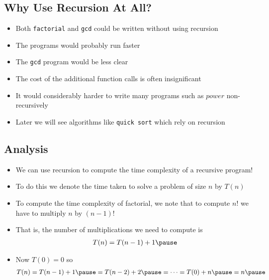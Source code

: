 \begin{slide}
\section[-1]{Why Use Recursion At All?}

\begin{PauseHighLight}
  \begin{itemize}
  \item Both \texttt{factorial} and \texttt{gcd} could be written
    without using recursion\pause
  \item The programs would probably run faster\pause
  \item The \texttt{gcd} program would be less clear\pause
  \item The cost of the additional function calls is often
    insignificant\pause
  \item It would considerably harder to write many programs such as
    \jl$power$ non-recursively\pause
  \item Later we will see algorithms like \texttt{quick sort} which rely on
    recursion\pause
  \end{itemize}
\end{PauseHighLight}
\end{slide}

\Outline

\begin{slide}
\section[-2]{Analysis}

\begin{PauseHighLight}
\begin{itemize}\squeeze
\item We can use recursion to compute the time complexity of a recursive
  program!\pause
\item To do this we denote the time taken to solve a problem of size $n$
  by $T(n)$\pause
\item To compute the time complexity of factorial, we note that to
  compute $n!$ we have to multiply $n$ by $(n-1)!$\pause
\item That is, the number of multiplications we need to compute is
  \begin{align*}
    T(n) = T(n-1) +1\pause
  \end{align*}
\item Now $T(0)=0$ so
  \begin{align*}
    T(n) = T(n-1) +1\pause = T(n-2) +2\pause = \cdots = T(0) +n\pause =
    n\pause
  \end{align*}
\end{itemize}
\end{PauseHighLight}
\end{slide}


